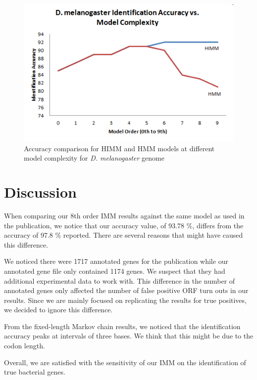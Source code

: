 \documentclass[11pt,letterpaper]{article}
\begin{document}
\begin{figure}
	\begin{center}
		\includegraphics[scale=0.8]{plots/accuracy_vs_model_complexity_drosophila_hmm.png}
	\end{center}
	\caption{\label{font-table} Accuracy comparison for HIMM and HMM models at different model complexity for \emph{D. melanogaster} genome}
\end{figure}


\section{Discussion}

When comparing our 8th order IMM results against the same model as used in the publication, we notice that our accuracy value, of 93.78 \%, differs from the accuracy of 97.8 \% reported. There are several reasons that might have caused this difference.

We noticed there were 1717 annotated genes for the publication while our annotated gene file only contained 1174 genes. We suspect that they had additional experimental data to work with. This difference in the number of annotated genes only affected the number of false positive ORF turn outs in our results. Since we are mainly focused on replicating the results for true positives, we decided to ignore this difference.

From the fixed-length Markov chain results, we noticed that the identification accuracy peaks at intervals of three bases. We think that this might be due to the codon length. 

Overall, we are satisfied with the sensitivity of our IMM on the identification of true bacterial genes.
\end{document}
